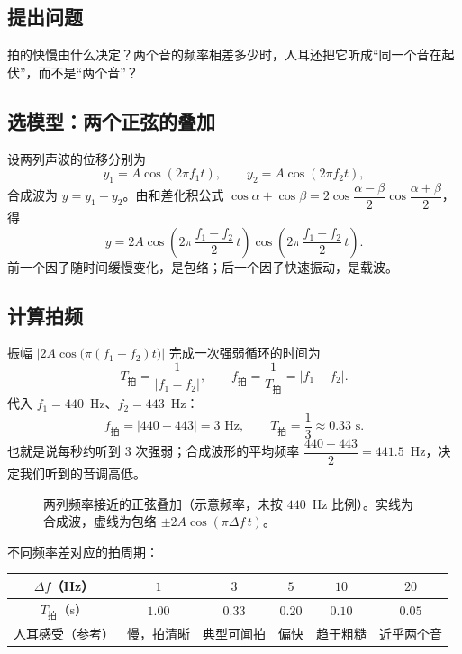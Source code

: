 \subsection{提出问题}
拍的快慢由什么决定？两个音的频率相差多少时，人耳还把它听成“同一个音在起伏”，而不是“两个音”？

\subsection{选模型：两个正弦的叠加}
设两列声波的位移分别为
\[
  y_1=A\cos(2\pi f_1t),\qquad y_2=A\cos(2\pi f_2t),
\]
合成波为 $y=y_1+y_2$。由和差化积公式
$\cos\alpha+\cos\beta=2\cos\dfrac{\alpha-\beta}{2}\cos\dfrac{\alpha+\beta}{2}$，得
\[
  y=2A\cos\!\left(2\pi\,\frac{f_1-f_2}{2}\,t\right)
     \cos\!\left(2\pi\,\frac{f_1+f_2}{2}\,t\right).
\]
前一个因子随时间缓慢变化，是包络；后一个因子快速振动，是载波。

\subsection{计算拍频}
振幅 $\left|2A\cos\bigl(\pi(f_1-f_2)t\bigr)\right|$ 完成一次强弱循环的时间为
\[
  T_{\text{拍}}=\frac{1}{|f_1-f_2|},
  \qquad
  f_{\text{拍}}=\frac{1}{T_{\text{拍}}}=|f_1-f_2|.
\]
代入 $f_1=440$~Hz、$f_2=443$~Hz：
\[
  f_{\text{拍}}=|440-443|=3\text{ Hz},\qquad
  T_{\text{拍}}=\frac13\approx0.33\text{ s}.
\]
也就是说每秒约听到 $3$ 次强弱；合成波形的平均频率 $\dfrac{440+443}{2}=441.5$~Hz，决定我们听到的音调高低。

\begin{figure}[htbp]
\centering
{}
\caption{两列频率接近的正弦叠加（示意频率，未按 $440$~Hz 比例）。实线为合成波，虚线为包络 $\pm2A\cos(\pi\Delta f\,t)$。}
\end{figure}

不同频率差对应的拍周期：

\begin{center}
\footnotesize
\setlength{\tabcolsep}{6pt}
\renewcommand{\arraystretch}{1.3}
\begin{tabular}{c|ccccc}
\toprule
$\Delta f$（Hz） & $1$ & $3$ & $5$ & $10$ & $20$ \\
\midrule
$T_{\text{拍}}$（s） & $1.00$ & $0.33$ & $0.20$ & $0.10$ & $0.05$ \\
\midrule
人耳感受（参考） & 慢，拍清晰 & 典型可闻拍 & 偏快 & 趋于粗糙 & 近乎两个音 \\
\bottomrule
\end{tabular}
\end{center}

